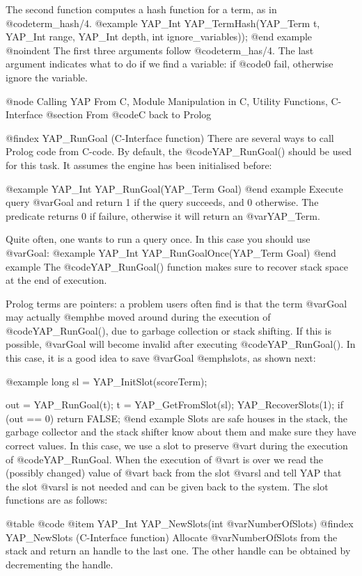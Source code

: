 {{{{{{{{The second function computes a hash function for a term, as in
@code{term_hash/4}.
@example
     YAP_Int    YAP_TermHash(YAP_Term t, YAP_Int range, YAP_Int depth, int  ignore_variables));
@end example
@noindent
The first three arguments follow @code{term_has/4}. The last argument
indicates what to do if we find a variable: if @code{0} fail, otherwise
ignore the variable. 

@node Calling YAP From C, Module Manipulation in C, Utility Functions, C-Interface
@section From @code{C} back to Prolog

@findex YAP_RunGoal (C-Interface function)
There are several ways to call Prolog code from C-code. By default, the
@code{YAP_RunGoal()} should be used for this task. It assumes the engine
has been initialised before:

@example
  YAP_Int YAP_RunGoal(YAP_Term Goal)
@end example
Execute query @var{Goal} and return 1 if the query succeeds, and 0
otherwise. The predicate returns 0 if failure, otherwise it will return
an @var{YAP_Term}. 

Quite often, one wants to run a query once. In this case you should use
@var{Goal}:
@example
  YAP_Int YAP_RunGoalOnce(YAP_Term Goal)
@end example
The  @code{YAP_RunGoal()} function makes sure to recover stack space at
the end of execution.

Prolog terms are pointers: a problem users often find is that the term
@var{Goal} may actually @emph{be moved around} during the execution of
@code{YAP_RunGoal()}, due to garbage collection or stack shifting. If
this is possible, @var{Goal} will become invalid after executing
@code{YAP_RunGoal()}. In this case, it is a good idea to save @var{Goal}
@emph{slots}, as shown next:

@example
  long sl = YAP_InitSlot(scoreTerm);

  out = YAP_RunGoal(t);
  t = YAP_GetFromSlot(sl);
  YAP_RecoverSlots(1);
  if (out == 0) return FALSE;
@end example
Slots are safe houses in the stack, the garbage collector and the stack
shifter know about them and make sure they have correct values. In this
case, we use a slot to preserve @var{t} during the execution of
@code{YAP_RunGoal}. When the execution of @var{t} is over we read the
(possibly changed) value of @var{t} back from the slot @var{sl} and tell
YAP that the slot @var{sl} is not needed and can be given back to the
system. The slot functions are as follows:

@table @code
@item YAP_Int YAP_NewSlots(int @var{NumberOfSlots})
@findex YAP_NewSlots (C-Interface function)
Allocate @var{NumberOfSlots} from the stack and return an handle to the
last one. The other handle can be obtained by decrementing the handle.

}}}}}}}}
